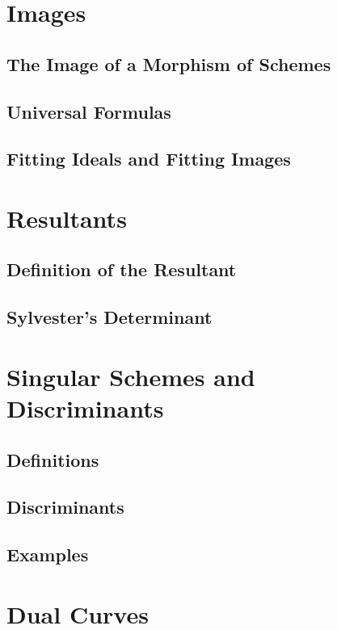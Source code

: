 \documentclass[oneside]{amsbook}
\numberwithin{ex}{chapter}
\begin{document}
\section{Images}
\subsection{The Image of a Morphism of Schemes}

\subsection{Universal Formulas}

\subsection{Fitting Ideals and Fitting Images}


\section{Resultants}
\subsection{Definition of the Resultant}

\subsection{Sylvester's Determinant}


\section{Singular Schemes and Discriminants}
\subsection{Definitions}

\subsection{Discriminants}

\subsection{Examples}


\section{Dual Curves}
\end{document}
